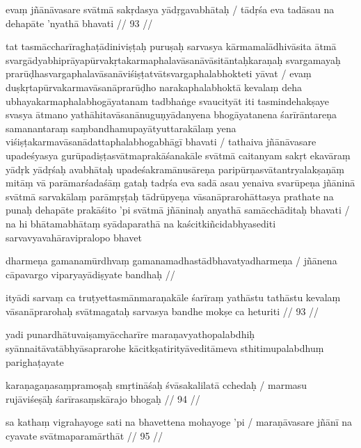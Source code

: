 evaṃ jñānāvasare svātmā sakṛdasya yādṛgavabhātaḥ  /
tādṛśa eva tadāsau na dehapāte 'nyathā bhavati  // 93  //

tat tasmāccharīraghaṭādiniviṣṭaḥ puruṣaḥ sarvasya kārmamalādhivāsita ātmā svargādyabhiprāyapūrvakṛtakarmaphalavāsanāvāsitāntaḥkaraṇaḥ svargamayaḥ prarūḍhasvargaphalavāsanāviśiṣṭatvātsvargaphalabhokteti yāvat  / evaṃ duṣkṛtapūrvakarmavāsanāprarūḍho narakaphalabhoktā kevalaṃ deha ubhayakarmaphalabhogāyatanam tadbhaṅge svaucityāt iti tasmindehakṣaye svasya ātmano yathāhitavāsanānuguṇyādanyena bhogāyatanena śarīrāntareṇa samanantaraṃ saṃbandhamupayātyuttarakālaṃ yena viśiṣṭakarmavāsanādattaphalabhogabhāgī bhavati  / tathaiva jñānāvasare upadeśyasya gurūpadiṣṭasvātmaprakāśanakāle svātmā caitanyam sakṛt ekavāraṃ yādṛk yādṛśaḥ avabhātaḥ upadeśakramānusāreṇa paripūrṇasvātantryalakṣaṇāṃ mitāṃ vā parāmarśadaśāṃ gataḥ tadṛśa eva sadā asau yenaiva svarūpeṇa jñāninā svātmā sarvakālaṃ parāmṛṣṭaḥ tādrūpyeṇa vāsanāprarohāttasya prathate na punaḥ dehapāte prakāśito 'pi svātmā jñāninaḥ anyathā samācchāditaḥ bhavati  / na hi bhātamabhātaṃ syādaparathā na kaścitkiñcidabhyasediti sarvavyavahāravipralopo bhavet

dharmeṇa gamanamūrdhvaṃ gamanamadhastādbhavatyadharmeṇa  /
jñānena cāpavargo viparyayādiṣyate bandhaḥ  //

ityādi sarvaṃ ca truṭyettasmānmaraṇakāle śarīraṃ yathāstu tathāstu kevalaṃ vāsanāprarohaḥ svātmagataḥ sarvasya bandhe mokṣe ca heturiti  // 93  //

yadi punardhātuvaiṣamyāccharīre maraṇavyathopalabdhiḥ syānnaitāvatābhyāsaprarohe kācitkṣatirityāveditāmeva sthitimupalabdhuṃ parighaṭayate

karaṇagaṇasaṃpramoṣaḥ smṛtināśaḥ śvāsakalilatā cchedaḥ  /
marmasu rujāviśeṣāḥ śarīrasaṃskārajo bhogaḥ  // 94  //

sa kathaṃ vigrahayoge sati na bhavettena mohayoge 'pi  /
maraṇāvasare jñānī na cyavate svātmaparamārthāt  // 95  //

